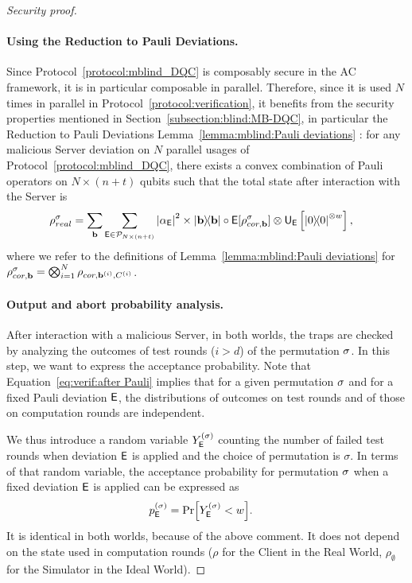 \begin{proof}[Security proof]
    \paragraph{Using the Reduction to Pauli Deviations.}
    Since Protocol~\ref{protocol:mblind_DQC} is composably secure in the AC framework, it is in particular composable in parallel. Therefore, since it is used $N$ times in parallel in Protocol~\ref{protocol:verification}, it benefits from the security properties mentioned in Section~\ref{subsection:blind:MB-DQC}, in particular the Reduction to Pauli Deviations Lemma~\ref{lemma:mblind:Pauli deviations} : for any malicious Server deviation on $N$ parallel usages of Protocol~\ref{protocol:mblind_DQC}, there exists a convex combination of Pauli operators on $N\times (n+t)$ qubits such that the total state after interaction with the Server is
    \begin{align}
        \label{eq:verif:after Pauli}
        \rho_{real}^\perm &=
        \sum_{\b}
        \sum_{\E\in\Pauli_{N\times(n+t)}}
        \abs{\alpha_{\E}}^2
        \times
            \ketbra \b
            \circ
            \E
            [\rho_{cor, \b}^{\perm}]
        \otimes \U_{\E}\left[
            \ketbra0^{\otimes w}
        \right],
    \end{align}
    where we refer to the definitions of Lemma~\ref{lemma:mblind:Pauli deviations} for
        $\rho_{cor, \mathbf b}^{\sigma}
        =
        \bigotimes_{i=1}^N
        \rho_{cor, \mathbf b^{(i)}, C^{(i)}}$.

    \paragraph{Output and abort probability analysis.}
    After interaction with a malicious Server, in both worlds, the traps are checked by analyzing the outcomes of test rounds ($i>d$) of the permutation $\sigma$.
    In this step, we want to express the acceptance probability.
    Note that Equation~\ref{eq:verif:after Pauli} implies that for a given permutation $\sigma$ and for a fixed Pauli deviation $\mathsf{E}$, the distributions of outcomes on test rounds and of those on computation rounds are independent.

    We thus introduce a random variable $Y^{(\sigma)}_{\mathsf{E}}$ counting the number of failed test rounds when deviation $\mathsf{E}$ is applied and the choice of permutation is $\sigma$.
    In terms of that random variable, the acceptance probability for permutation $\sigma$ when a fixed deviation $\mathsf{E}$ is applied can be expressed as
    \begin{align}
        p_{\mathsf{E}}^{(\sigma)}
        &=
        \Pr[Y^{(\sigma)}_{\mathsf{E}} < w].
    \end{align}
    It is identical in both worlds, because of the above comment. It does not depend on the state used in computation rounds ($\rho$ for the Client in the Real World, $\rho_\emptyset$ for the Simulator in the Ideal World).


\end{proof}
